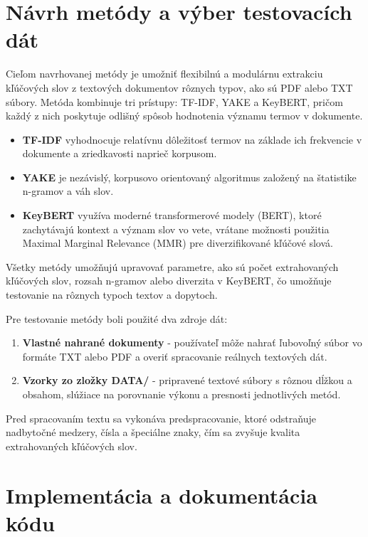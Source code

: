 \documentclass[a4paper,12pt]{article}
\begin{document}
\section{Návrh metódy a výber testovacích dát}

Cieľom navrhovanej metódy je umožniť flexibilnú a modulárnu extrakciu kľúčových slov z textových dokumentov rôznych typov, ako sú PDF alebo TXT súbory. Metóda kombinuje tri prístupy: TF-IDF, YAKE a KeyBERT, pričom každý z nich poskytuje odlišný spôsob hodnotenia významu termov v dokumente.  

\begin{itemize}
    \item \textbf{TF-IDF} vyhodnocuje relatívnu dôležitosť termov na základe ich frekvencie v dokumente a zriedkavosti naprieč korpusom.
    \item \textbf{YAKE} je nezávislý, korpusovo orientovaný algoritmus založený na štatistike n-gramov a váh slov.
    \item \textbf{KeyBERT} využíva moderné transformerové modely (BERT), ktoré zachytávajú kontext a význam slov vo vete, vrátane možnosti použitia Maximal Marginal Relevance (MMR) pre diverzifikované kľúčové slová.
\end{itemize}

Všetky metódy umožňujú upravovať parametre, ako sú počet extrahovaných kľúčových slov, rozsah n-gramov alebo diverzita v KeyBERT, čo umožňuje testovanie na rôznych typoch textov a dopytoch.

Pre testovanie metódy boli použité dva zdroje dát:  

\begin{enumerate}
    \item \textbf{Vlastné nahrané dokumenty} - používateľ môže nahrať ľubovoľný súbor vo formáte TXT alebo PDF a overiť spracovanie reálnych textových dát.
    \item \textbf{Vzorky zo zložky DATA/} - pripravené textové súbory s rôznou dĺžkou a obsahom, slúžiace na porovnanie výkonu a presnosti jednotlivých metód.
\end{enumerate}

Pred spracovaním textu sa vykonáva predspracovanie, ktoré odstraňuje nadbytočné medzery, čísla a špeciálne znaky, čím sa zvyšuje kvalita extrahovaných kľúčových slov.

\section{Implementácia a dokumentácia kódu}
\end{document}

